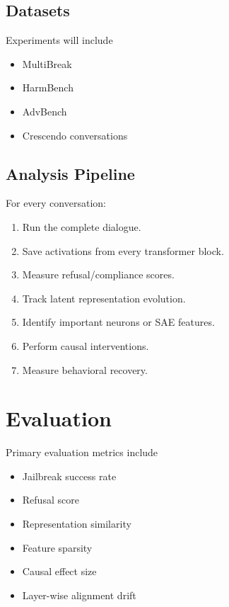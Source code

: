 \documentclass[11pt]{article}
\begin{document}
\subsection{Datasets}

Experiments will include

\begin{itemize}

\item MultiBreak

\item HarmBench

\item AdvBench

\item Crescendo conversations

\end{itemize}

\subsection{Analysis Pipeline}

For every conversation:

\begin{enumerate}

\item Run the complete dialogue.

\item Save activations from every transformer block.

\item Measure refusal/compliance scores.

\item Track latent representation evolution.

\item Identify important neurons or SAE features.

\item Perform causal interventions.

\item Measure behavioral recovery.

\end{enumerate}

\section{Evaluation}

Primary evaluation metrics include

\begin{itemize}

\item Jailbreak success rate

\item Refusal score

\item Representation similarity

\item Feature sparsity

\item Causal effect size

\item Layer-wise alignment drift

\end{itemize}
\end{document}
